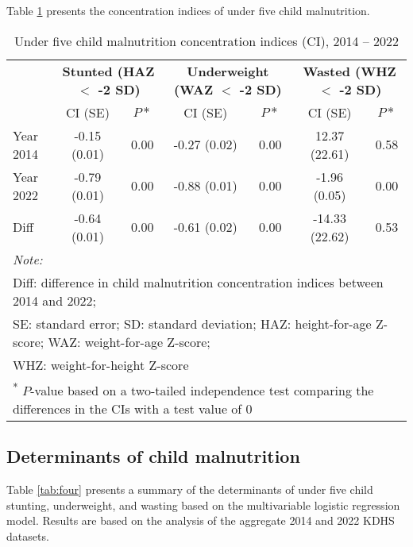 \documentclass[sn-basic,Numbered,pdflatex]{sn-jnl}
\theoremstyle{remark}
\theoremstyle{definition}
\begin{document}
Table \ref{tab:three} presents the concentration indices of under five
child malnutrition.

\begin{table}[!h]

\caption{\label{tab:three}Under five child malnutrition concentration indices (CI), 2014 -- 2022}
\centering
\begin{tabular}[t]{lcccccc}
\toprule
\multicolumn{1}{c}{\textbf{ }} & \multicolumn{2}{c}{\textbf{Stunted (HAZ $<$ -2 SD)}} & \multicolumn{2}{c}{\textbf{Underweight (WAZ $<$ -2 SD)}} & \multicolumn{2}{c}{\textbf{Wasted (WHZ $<$ -2 SD)}} \\
\cmidrule(l{3pt}r{3pt}){2-3} \cmidrule(l{3pt}r{3pt}){4-5} \cmidrule(l{3pt}r{3pt}){6-7}
  & CI (SE) & $P*$ & CI (SE) & $P*$ & CI (SE) & $P*$\\
\midrule
Year 2014 & -0.15 (0.01) & 0.00 & -0.27 (0.02) & 0.00 & 12.37 (22.61) & 0.58\\
Year 2022 & -0.79 (0.01) & 0.00 & -0.88 (0.01) & 0.00 & -1.96 (0.05) & 0.00\\
Diff & -0.64 (0.01) & 0.00 & -0.61 (0.02) & 0.00 & -14.33 (22.62) & 0.53\\
\bottomrule
\multicolumn{7}{l}{\rule{0pt}{1em}\textit{Note: }}\\
\multicolumn{7}{l}{\rule{0pt}{1em}Diff: difference in child malnutrition concentration indices between 2014 and 2022;}\\
\multicolumn{7}{l}{\rule{0pt}{1em}SE: standard error; SD: standard deviation; HAZ: height-for-age Z-score; WAZ: weight-for-age Z-score;}\\
\multicolumn{7}{l}{\rule{0pt}{1em}WHZ: weight-for-height Z-score}\\
\multicolumn{7}{l}{\rule{0pt}{1em}\textsuperscript{*} $P$-value based on a two-tailed independence test comparing the differences in the CIs with a test value of 0}\\
\end{tabular}
\end{table}

\hypertarget{determinants-of-child-malnutrition}{%
\subsection{Determinants of child
malnutrition}\label{determinants-of-child-malnutrition}}

Table \ref{tab:four} presents a summary of the determinants of under
five child stunting, underweight, and wasting based on the multivariable
logistic regression model. Results are based on the analysis of the
aggregate 2014 and 2022 KDHS datasets.
\end{document}
